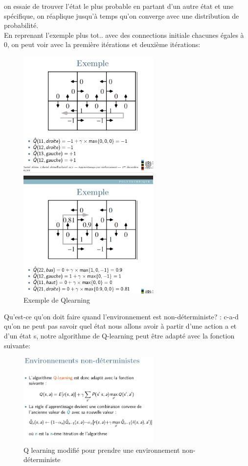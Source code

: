 \documentclass[oneside]{book}
\begin{document}
on essaie de trouver l'état le plus probable en partant d'un autre état et une spécifique, on réaplique jusqu'à temps qu'on converge avec une distribution de probabilité.\\

En reprenant l'exemple plus tot.. avec des connections initiale chacunes égales à 0, on peut voir avec la première itérations et deuxième itérations:\\

\begin{figure}[!ht]
\centering
\includegraphics[width = 7cm]{qlearning_example.png}
\caption{Exemple de Qlearning}
\end{figure}

Qu'est-ce qu'on doit faire quand l'environnement est non-déterministe? : c-a-d qu'on ne peut pas savoir quel état nous allons avoir à partir d'une action a et d'un état s, notre algorithme de Q-learning peut être adapté avec la fonction suivante:\\

\begin{figure}[!ht]
\centering
\includegraphics[width = 7cm]{qlearning_stochastique.png}
\caption{Q learning modifié pour prendre une environnement non-déterministe}
\end{figure}
\end{document}

